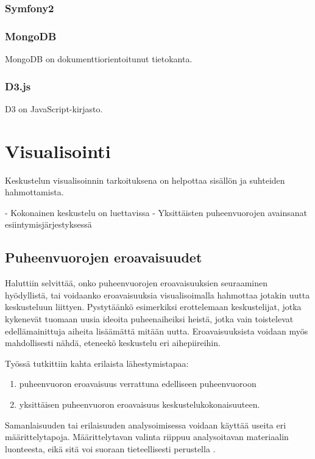 \documentclass[11pt,a4paper,oneside]{memoir}
\begin{document}
\subsection{Symfony2}

\subsection{MongoDB}
MongoDB on dokumenttiorientoitunut tietokanta. 

\subsection{D3.js}
D3 on JavaScript-kirjasto.

\chapter{Visualisointi}
Keskustelun visualisoinnin tarkoituksena on helpottaa sisällön ja suhteiden hahmottamista.

- Kokonainen keskustelu on luettavissa
- Yksittäisten puheenvuorojen avainsanat esiintymisjärjestyksessä

\section{Puheenvuorojen eroavaisuudet}
Haluttiin selvittää, onko puheenvuorojen eroavaisuuksien seuraaminen hyödyllistä, tai voidaanko eroavaisuuksia visualisoimalla hahmottaa jotakin uutta keskusteluun liittyen. Pystytäänkö esimerkiksi erottelemaan keskustelijat, jotka kykenevät tuomaan uusia ideoita puheenaiheiksi heistä, jotka vain toistelevat edellämainittuja aiheita lisäämättä mitään uutta. Eroavaisuuksista voidaan myös mahdollisesti nähdä, eteneekö keskustelu eri aihepiireihin.

Työssä tutkittiin kahta erilaista lähestymistapaa:
\begin{enumerate}
\item puheenvuoron eroavaisuus verrattuna edelliseen puheenvuoroon
\item yksittäisen puheenvuoron eroavaisuus keskustelukokonaisuuteen.
\end{enumerate}

Samanlaisuuden tai erilaisuuden analysoimisessa voidaan käyttää useita eri  määrittelytapoja. Määrittelytavan valinta riippuu analysoitavan materiaalin luonteesta, eikä sitä voi suoraan tieteellisesti perustella \cite[s. 298]{encyclopedia-of-distances}.
\end{document}

